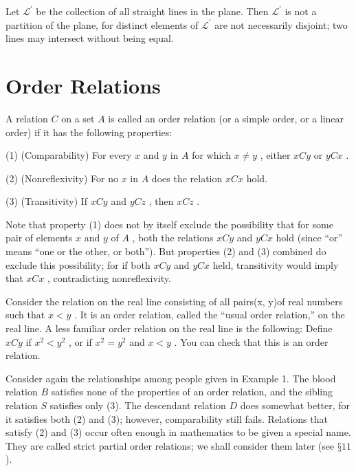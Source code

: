 \begin{centeredblock}
\begin{example} Let \({\mathcal{L}}^{\prime }\) be the collection of all straight lines in the plane. Then \({\mathcal{L}}^{\prime }\) is not a partition of the plane, for distinct elements of \({\mathcal{L}}^{\prime }\) are not necessarily disjoint; two lines may intersect without being equal.
\end{example}
\end{centeredblock}

\section*{Order Relations}

A relation \(C\) on a set \(A\) is called an order relation (or a simple order, or a linear order) if it has the following properties:

(1) (Comparability) For every \(x\) and \(y\) in \(A\) for which \(x \neq  y\) , either \({xCy}\) or \({yCx}\) .

(2) (Nonreflexivity) For no \(x\) in \(A\) does the relation \({xCx}\) hold.

(3) (Transitivity) If \({xCy}\) and \({yCz}\) , then \({xCz}\) .

Note that property (1) does not by itself exclude the possibility that for some pair of elements \(x\) and \(y\) of \(A\) , both the relations \({xCy}\) and \({yCx}\) hold (since ``or'' means ``one or the other, or both''). But properties (2) and (3) combined do exclude this possibility; for if both \({xCy}\) and \({yCx}\) held, transitivity would imply that \({xCx}\) , contradicting nonreflexivity.

\begin{centeredblock}
\begin{example} Consider the relation on the real line consisting of all pairs(x, y)of real numbers such that \(x < y\) . It is an order relation, called the ``usual order relation,'' on the real line. A less familiar order relation on the real line is the following: Define \({xCy}\) if \({x}^{2} < {y}^{2}\) , or if \({x}^{2} = {y}^{2}\) and \(x < y\) . You can check that this is an order relation.
\end{example}
\end{centeredblock}

\begin{centeredblock}
\begin{example} Consider again the relationships among people given in Example 1. The blood relation \(B\) satisfies none of the properties of an order relation, and the sibling relation \(S\) satisfies only (3). The descendant relation \(D\) does somewhat better, for it satisfies both (2) and (3); however, comparability still fails. Relations that satisfy (2) and (3) occur often enough in mathematics to be given a special name. They are called strict partial order relations; we shall consider them later (see \(§{11}\) ).
\end{example}
\end{centeredblock}

